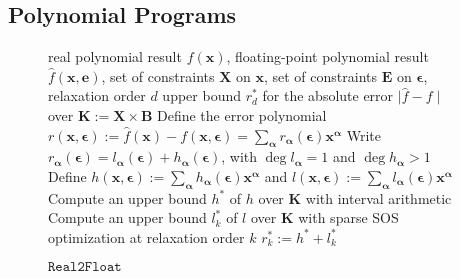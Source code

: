 \documentclass[preprint]{sigplanconf}
\newcommand{\x}{\mathbf{x}}
\newcommand{\e}{\mathbf{e}}
\newcommand{\y}{\mathbf{y}}
\newcommand{\alphab}{\boldsymbol{\alpha}}
\newcommand{\epsilonb}{\boldsymbol{\epsilon}}
\def\B{\mathbf{B}}
\def\E{\mathbf{E}}
\def\K{\mathbf{K}}
\def\X{\mathbf{X}}
\def\Y{\mathbf{Y}}
\newcommand{\realtofloat}{\mathtt{Real2Float}}
\theoremstyle{plain}
\begin{document}
\subsection{Polynomial Programs}

\begin{figure}[!ht]
\begin{algorithmic}[1]                    
\Require real polynomial result $f(\x)$, floating-point polynomial result $\hat{f}(\x, \e)$, set of constraints $\X$ on $\x$, set of constraints $\E$ on $\epsilonb$, relaxation order $d$
\Ensure upper bound $r_d^*$ for the absolute error $\mid \hat{f} - f  \mid$ over $\K := \X \times \B$
\State Define the error polynomial $r(\x, \epsilonb) := \hat{f}(\x) - f(\x, \epsilonb) = \displaystyle\sum_{\alphab} r_{\alphab}(\epsilonb) \x^{\alphab}$
\For {each $\alphab$}
\State Write $r_{\alphab}(\epsilonb) = l_{\alphab}(\epsilonb) + h_{\alphab}(\epsilonb)$, with $\deg l_{\alphab} = 1$ and $\deg h_{\alphab} > 1$
\EndFor
\State Define $h(\x, \epsilonb) := \displaystyle\sum_{\alphab} h_{\alphab}(\epsilonb) \x^{\alphab}$ and $l(\x,\epsilonb):= \displaystyle\sum_{\alphab} l_{\alphab}(\epsilonb) \x^{\alphab}$
\State Compute an upper bound $h^*$ of $h$ over $\K$ with interval arithmetic
\State Compute an upper bound $l_k^*$ of $l$ over $\K$ with sparse SOS optimization at relaxation order $k$ \label{line:boundq}
\State \Return $r_k^* := h^* + l_k^*$
\end{algorithmic}
\caption{$\realtofloat$}
\label{alg:realtofloat}
\end{figure}
\end{document}
